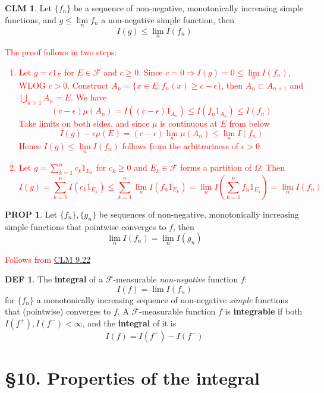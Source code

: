 \documentclass[hidelinks]{article}
\theoremstyle{definition}
\newtheorem*{defin}{DEF}
\theoremstyle{dotless}
\newtheorem{proposition}{PROP}[section]
\newtheorem{claim}{CLM}[section]
\theoremstyle{remark}
\begin{document}
\begin{claim}\label{CLM 9.22}
Let $\{f_n\}$ be a sequence of non-negative, monotonically increasing simple functions, and $g\leq\lim\limits_nf_n$ a non-negative simple function, then
\[I(g)\leq\lim\limits_nI(f_n)\]
\end{claim}
\textcolor{red}{The proof follows in two steps:\begin{enumerate}[label=\arabic*\degree]
    \item Let $g=c1_E$ for $E\in\mathscr{F}$ and $c\geq0$. Since $c=0\Rightarrow I(g)=0\leq\lim\limits_nI(f_n)$, WLOG $c>0$.\newline
    Construct $A_n=\{x\in E:f_n(x)\geq c-\epsilon\}$, then $A_n\subset A_{n+1}$ and $\bigcup\limits_{n\geq1}A_n=E$. We have
    \[(c-\epsilon)\mu(A_n)=I((c-\epsilon)1_{A_n})\leq I(f_n1_{A_n})\leq I(f_n)\]
    Take limits on both sides, and since $\mu$ is continuous at $E$ from below
    \[I(g)-\epsilon\mu(E)=(c-\epsilon)\lim_n\mu(A_n)\leq\lim_nI(f_n)\]
    Hence $I(g)\leq\lim\limits_nI(f_n)$ follows from the arbitrariness of $\epsilon>0$.
    \item Let $g=\sum\limits_{k=1}^nc_k1_{E_k}$ for $c_k\geq0$ and $E_k\in\mathcal{F}$ forms a partition of $\Omega$. Then
    \[I(g)=\sum_{k=1}^nI(c_k1_{E_k})\leq\sum_{k=1}^n\lim_nI(f_n1_{E_k})=\lim_nI(\sum_{k=1}^nf_n1_{E_k})=\lim_nI(f_n)\]
\end{enumerate}}

\begin{proposition}
Let $\{f_n\},\{g_n\}$ be sequences of non-negative, monotonically increasing simple functions that pointwise converges to $f$, then
\[\lim_nI(f_n)=\lim_nI(g_n)\]
\end{proposition}
\textcolor{red}{Follows from \hyperref[CLM 9.22]{CLM 9.22}}

\begin{defin}
The \textbf{integral} of a $\mathscr{F}$-measurable \emph{non-negative} function $f$: \[I(f)=\lim I(f_n)\]
for $\{f_n\}$ a monotonically increasing sequence of non-negative \emph{simple} functions that (pointwise) converges to $f$.\newline
A $\mathscr{F}$-measurable function $f$ is \textbf{integrable} if both $I(f^+),I(f^-)<\infty$, and the \textbf{integral} of it is
\[I(f)=I(f^+)-I(f^-)\]
\end{defin}

\bigbreak

\section*{\S10. Properties of the integral}
\setcounter{section}{10}
\end{document}
